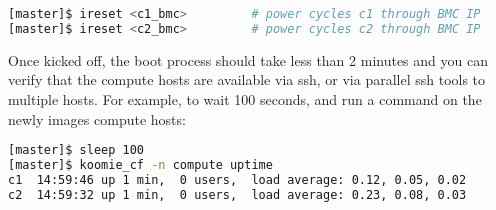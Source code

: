 \documentclass[letterpaper]{article}
\begin{document}
\begin{lstlisting}[language=bash,keywords={},upquote=true]
[master]$ ireset <c1_bmc>         # power cycles c1 through BMC IP
[master]$ ireset <c2_bmc>         # power cycles c2 through BMC IP
\end{lstlisting} 


\vspace*{0.25cm}
Once kicked off, the boot process should take less than 2 minutes and you can
verify that the compute hosts are available via ssh, or via parallel ssh tools to multiple
hosts. For example, to wait 100 seconds, and run a command on the newly images
compute hosts:


\vspace*{0.2cm}
\begin{lstlisting}[language=bash]
[master]$ sleep 100
[master]$ koomie_cf -n compute uptime
c1  14:59:46 up 1 min,  0 users,  load average: 0.12, 0.05, 0.02
c2  14:59:32 up 1 min,  0 users,  load average: 0.23, 0.08, 0.03
\end{lstlisting}

\end{document}
